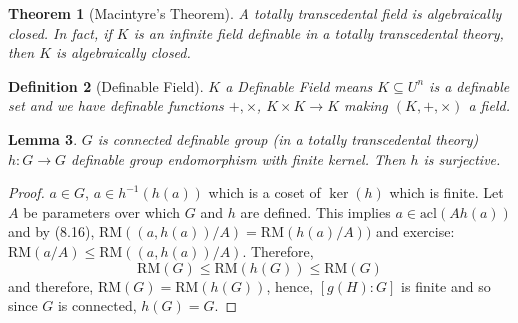\documentclass[letterpaper, 12pt]{article}
\newcommand{\RM}{\mbox{RM}}
\newcommand{\acl}{\mbox{acl}}
\theoremstyle{stdthm}
\newtheorem{thm}{Theorem}[section]
\newtheorem{lem}[thm]{Lemma}
\theoremstyle{stddef}
\newtheorem{defn}[thm]{Definition}
\theoremstyle{stdnonum}
\theoremstyle{stdqands}
\theoremstyle{stdbold}
\begin{document}
\begin{thm}[Macintyre's Theorem]
A totally transcedental field is algebraically closed. In fact, if $K$ is an infinite field definable in a totally transcedental theory, then $K$ is algebraically closed. 
\end{thm}

\begin{defn}[Definable Field]
$K$ a Definable Field means $K \subseteq U^n$ is a definable set and we have definable functions $+,\times$, $K\times K \to K$ making $(K,+,\times)$ a field. 
\end{defn}

\begin{lem}
$G$ is connected definable group (in a totally transcedental theory) $h:G \to G$ definable group endomorphism with finite kernel. Then $h$ is surjective. 
\end{lem}

 \begin{proof}
 $a \in G$, $a \in h^{-1}(h(a))$ which is a coset of $\ker(h)$ which is finite. Let $A$ be parameters over which $G$ and $h$ are defined. This implies $a \in \acl(Ah(a))$ and by (8.16), $\RM((a,h(a))/A) = \RM(h(a)/A))$ and exercise: $\RM(a/A) \leq \RM((a,h(a)) /A)$. Therefore, 
 \[ \RM(G) \leq \RM(h(G)) \leq \RM(G) \]
 and therefore, $\RM(G) = \RM(h(G))$, hence, $[g(H): G]$ is finite and so since $G$ is connected, $h(G) = G$. 
 \end{proof}
\end{document}
